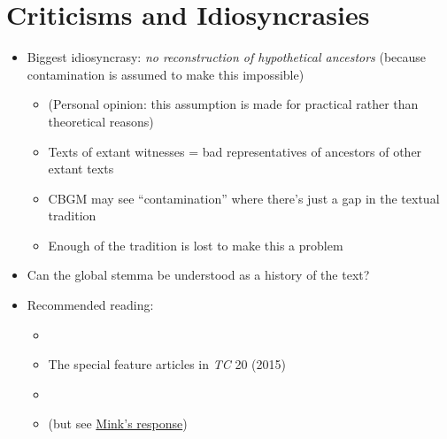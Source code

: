 \documentclass[10pt]{beamer}
\begin{document}
	\section*{Criticisms and Idiosyncrasies}
	\begin{frame}
		\begin{itemize}
			\item Biggest idiosyncrasy: \emph{no reconstruction of hypothetical ancestors} (because contamination is assumed to make this impossible)
			\begin{itemize}
				\item (Personal opinion: this assumption is made for practical rather than theoretical reasons)
				\item Texts of extant witnesses = bad representatives of ancestors of other extant texts
				\item CBGM may see ``contamination'' where there's just a gap in the textual tradition
				\item Enough of the tradition is lost to make this a problem
			\end{itemize}
			\item Can the global stemma be understood as a history of the text?
		\end{itemize}
	\end{frame}
	\begin{frame}
		\begin{itemize}
			\item Recommended reading:
			\begin{itemize}
				\item \cite{Jongkind14}
				\item The special feature articles in \emph{TC} 20 (2015)
				\item \cite{Gurry18}
				\item \cite{Carlson20} (but see \href{http://ntvmr.uni-muenster.de/en_US/intfblog/-/blogs/remarks-on-carlson-a-bias-at-the-heart-of-the-cbgm-guest-post-by-gerd-mink-}{Mink's response})
			\end{itemize}
		\end{itemize}
	\end{frame}
\end{document}
